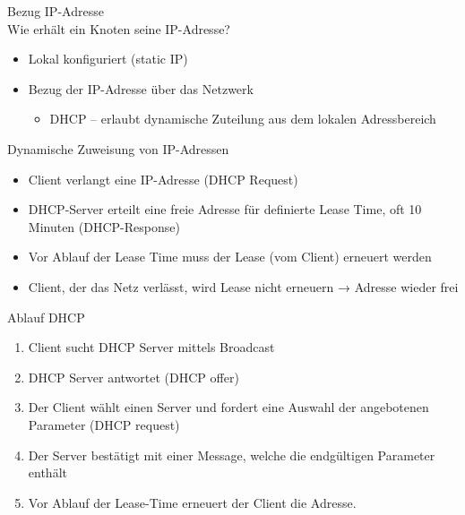 \begin{definition}{Bezug IP-Adresse}\\
    Wie erhält ein Knoten seine IP-Adresse?
    \begin{itemize}
        \item Lokal konfiguriert (static IP)
        \item Bezug der IP-Adresse über das Netzwerk
        \begin{itemize}
            \item DHCP – erlaubt dynamische Zuteilung aus dem lokalen Adressbereich
        \end{itemize}
    \end{itemize}
\end{definition}

\begin{concept}{Dynamische Zuweisung von IP-Adressen}
    \begin{itemize}
        \item Client verlangt eine IP-Adresse (DHCP Request)
        \item DHCP-Server erteilt eine freie Adresse für definierte Lease Time, oft 10 Minuten (DHCP-Response)
        \item Vor Ablauf der Lease Time muss der Lease (vom Client) erneuert werden
        \item Client, der das Netz verlässt, wird Lease nicht erneuern → Adresse wieder frei
    \end{itemize}
\end{concept}



\begin{KR}{Ablauf DHCP}
    \begin{enumerate}
        \item Client sucht DHCP Server mittels Broadcast
        \item DHCP Server antwortet (DHCP offer)
        \item Der Client wählt einen Server und fordert eine Auswahl der angebotenen Parameter (DHCP request)
        \item Der Server bestätigt mit einer Message, welche die endgültigen Parameter enthält
        \item Vor Ablauf der Lease-Time erneuert der Client die Adresse.
    \end{enumerate}
\end{KR}

\columnbreak

